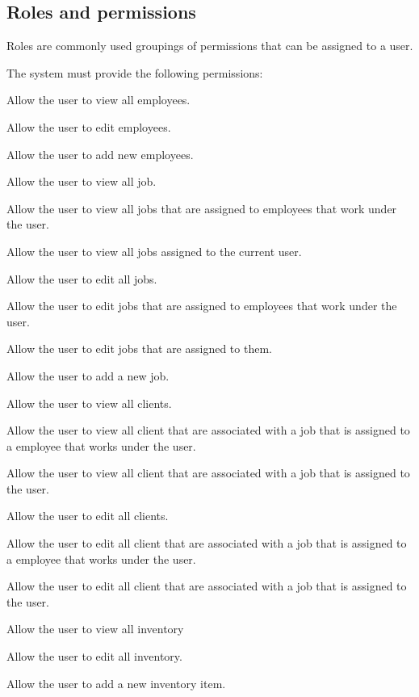 \documentclass{article}
\begin{document}
	\subsection*{Roles and permissions}	
	Roles are commonly used groupings of permissions that can be assigned to a user.
	\begin{list}{R.}{}
		\item The system must provide the following permissions:
		\begin{list}{R.}{}
			\item Allow the user to view all employees.
			\item Allow the user to edit employees.
			\item Allow the user to add new employees.
			\item Allow the user to view all job.
			\item Allow the user to view all jobs that are assigned to employees that work under the user.
			\item Allow the user to view all jobs assigned to the current user.
			\item Allow the user to edit all jobs.
			\item Allow the user to edit jobs that are assigned to employees that work under the user.
			\item Allow the user to edit jobs that are assigned to them.
			\item Allow the user to add a new job.
			\item Allow the user to view all clients.
			\item Allow the user to view all client that are associated with a job that is assigned to a employee that works under the user.
			\item Allow the user to view all client that are associated with a job that is assigned to the user.
			\item Allow the user to edit all clients.
			\item Allow the user to edit all client that are associated with a job that is assigned to a employee that works under the user.
			\item Allow the user to edit all client that are associated with a job that is assigned to the user.
			\item Allow the user to view all inventory
			\item Allow the user to edit all inventory.
			\item Allow the user to add a new inventory item.

\end{list}
\end{list}
\end{document}
